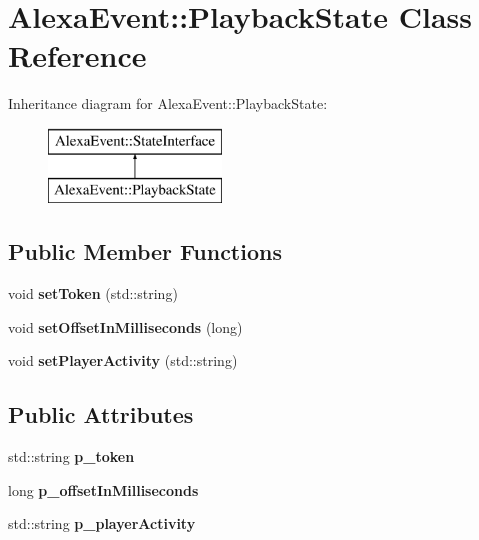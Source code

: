 \hypertarget{classAlexaEvent_1_1PlaybackState}{}\section{Alexa\+Event\+:\+:Playback\+State Class Reference}
\label{classAlexaEvent_1_1PlaybackState}
Inheritance diagram for Alexa\+Event\+:\+:Playback\+State\+:\begin{figure}[H]
\begin{center}
\leavevmode
\includegraphics[height=2.000000cm]{d3/d59/classAlexaEvent_1_1PlaybackState}
\end{center}
\end{figure}
\subsection*{Public Member Functions}
\begin{DoxyCompactItemize}
\item 
\mbox{\label{classAlexaEvent_1_1PlaybackState_ab1a9a42faacf8b1ae04845ed21302d4c}} 
void {\bfseries set\+Token} (std\+::string)
\item 
\mbox{\label{classAlexaEvent_1_1PlaybackState_a8eae79c5ad49eae699df5c0d311de9bd}} 
void {\bfseries set\+Offset\+In\+Milliseconds} (long)
\item 
\mbox{\label{classAlexaEvent_1_1PlaybackState_a3406bf0234423155032bd7def4339c4d}} 
void {\bfseries set\+Player\+Activity} (std\+::string)
\end{DoxyCompactItemize}
\subsection*{Public Attributes}
\begin{DoxyCompactItemize}
\item 
\mbox{\label{classAlexaEvent_1_1PlaybackState_a0746d42b3f03fc3929cc96d8adf0a10b}} 
std\+::string {\bfseries p\+\_\+token}
\item 
\mbox{\label{classAlexaEvent_1_1PlaybackState_a93f3f0f5d95f2315fa1268e25b3867cc}} 
long {\bfseries p\+\_\+offset\+In\+Milliseconds}
\item 
\mbox{\label{classAlexaEvent_1_1PlaybackState_af685eb997ead5b5af41c333e4f6dd35f}} 
std\+::string {\bfseries p\+\_\+player\+Activity}
\end{DoxyCompactItemize}
